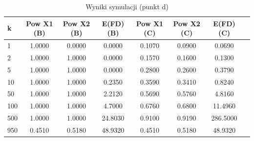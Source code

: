 \begin{table}[H]
\caption{Wyniki symulacji (punkt d)}
\label{tab:zad2_d}
\begin{tabular}{lccccccc}
\toprule
k & Pow X1 (B) & Pow X2 (B) & E(FD) (B) & Pow X1 (C) & Pow X2 (C) & E(FD) (C) \\
\midrule
1 & 1.0000 & 0.0000 & 0.0000 & 0.1070 & 0.0900 & 0.0690 \\
2 & 1.0000 & 1.0000 & 0.0000 & 0.1570 & 0.1600 & 0.1300 \\
5 & 1.0000 & 1.0000 & 0.0000 & 0.2800 & 0.2600 & 0.3790 \\
10 & 1.0000 & 1.0000 & 0.2350 & 0.3590 & 0.3410 & 0.8240 \\
50 & 1.0000 & 1.0000 & 2.2120 & 0.5690 & 0.5760 & 4.8160 \\
100 & 1.0000 & 1.0000 & 4.7000 & 0.6760 & 0.6800 & 11.4960 \\
500 & 1.0000 & 1.0000 & 24.8030 & 0.9100 & 0.9190 & 286.5000 \\
950 & 0.4510 & 0.5180 & 48.9320 & 0.4510 & 0.5180 & 48.9320 \\
\bottomrule
\end{tabular}
\end{table}
